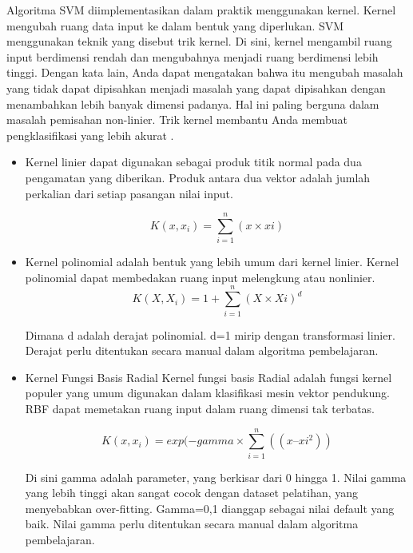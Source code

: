 \par Algoritma SVM diimplementasikan dalam praktik menggunakan kernel. Kernel mengubah ruang data input ke dalam bentuk yang diperlukan. SVM menggunakan teknik yang disebut trik kernel. Di sini, kernel mengambil ruang input berdimensi rendah dan mengubahnya menjadi ruang berdimensi lebih tinggi. Dengan kata lain, Anda dapat mengatakan bahwa itu mengubah masalah yang tidak dapat dipisahkan menjadi masalah yang dapat dipisahkan dengan menambahkan lebih banyak dimensi padanya. Hal ini paling berguna dalam masalah pemisahan non-linier. Trik kernel membantu Anda membuat pengklasifikasi yang lebih akurat \citep{Campbell2010}.
\begin{itemize}
	\itemsep0em
	\item Kernel linier dapat digunakan sebagai produk titik normal pada dua pengamatan yang diberikan. Produk antara dua vektor adalah jumlah perkalian dari setiap pasangan nilai input.

	      \begin{equation}
		      K(x, x_{i}) = \sum_{i=1}^{n} (x \times x{i})
	      \end{equation}

	\item Kernel polinomial adalah bentuk yang lebih umum dari kernel linier. Kernel polinomial dapat membedakan ruang input melengkung atau nonlinier.
	      \begin{equation}
		      K(X,X_{i})= 1 + \sum_{i=1}^{n} (X \times X{i})^d
	      \end{equation}

	      Dimana d adalah derajat polinomial. d=1 mirip dengan transformasi linier. Derajat perlu ditentukan secara manual dalam algoritma pembelajaran.

	\item Kernel Fungsi Basis Radial Kernel fungsi basis Radial adalah fungsi kernel populer yang umum digunakan dalam klasifikasi mesin vektor pendukung. RBF dapat memetakan ruang input dalam ruang dimensi tak terbatas.

	      \begin{equation}
		      K(x,x_{i}) = exp(-gamma \times \sum_{i=1}^{n} ((x – x{i}^2))
	      \end{equation}

	      Di sini gamma adalah parameter, yang berkisar dari 0 hingga 1. Nilai gamma yang lebih tinggi akan sangat cocok dengan dataset pelatihan, yang menyebabkan over-fitting. Gamma=0,1 dianggap sebagai nilai default yang baik. Nilai gamma perlu ditentukan secara manual dalam algoritma pembelajaran.
\end{itemize}


